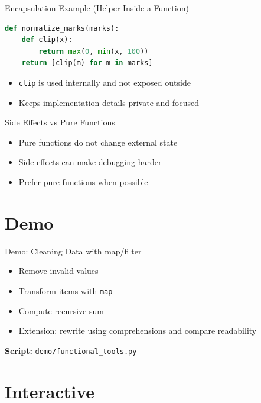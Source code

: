 \documentclass{beamer}
\begin{document}
\begin{frame}[fragile]{Encapsulation Example (Helper Inside a Function)}
  \begin{lstlisting}[language=Python]
def normalize_marks(marks):
    def clip(x):
        return max(0, min(x, 100))
    return [clip(m) for m in marks]
  \end{lstlisting}
  \begin{itemize}[<+->]
    \item \texttt{clip} is used internally and not exposed outside
    \item Keeps implementation details private and focused
  \end{itemize}
\end{frame}

\begin{frame}[fragile]{Side Effects vs Pure Functions}
  \begin{itemize}[<+->]
    \item Pure functions do not change external state
    \item Side effects can make debugging harder
    \item Prefer pure functions when possible
  \end{itemize}
\end{frame}

\section{Demo}
\label{sec:demo}

\begin{frame}[fragile]{Demo: Cleaning Data with map/filter}
  \begin{itemize}[<+->]
    \item Remove invalid values
    \item Transform items with \texttt{map}
    \item Compute recursive sum
    \item Extension: rewrite using comprehensions and compare readability
  \end{itemize}
  \vspace{0.4em}
  \textbf{Script:} \texttt{demo/functional\_tools.py}
\end{frame}

\section{Interactive}
\label{sec:interactive}
\end{document}
